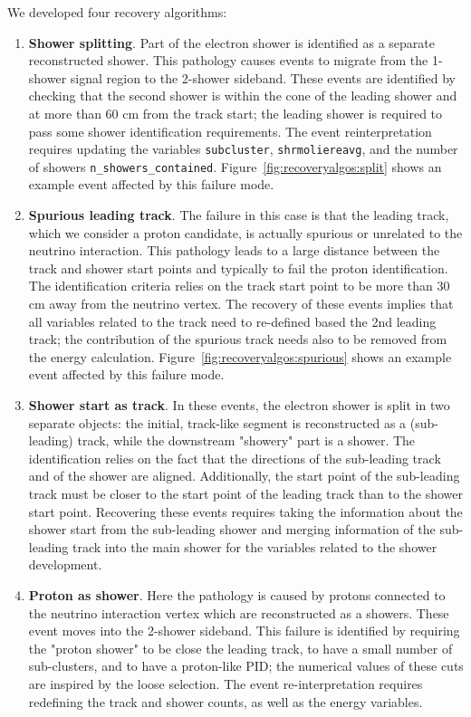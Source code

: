 We developed four recovery algorithms:
\begin{enumerate}
    \item {\bf Shower splitting}. Part of the electron shower is identified as a separate reconstructed shower. This pathology causes \npsel events to migrate from the 1-shower signal region to the 2-shower sideband. These events are identified by checking that the second shower is within the cone of the leading shower and at more than 60 cm from the track start; the leading shower is required to pass some shower identification requirements. The event reinterpretation requires updating the variables \texttt{subcluster}, \texttt{shrmoliereavg}, and the number of showers \texttt{n\_showers\_contained}. Figure~\ref{fig:recoveryalgos:split} shows an example event affected by this failure mode.
    \item {\bf Spurious leading track}. The failure in this case is that the leading track, which we consider a proton candidate, is actually spurious or unrelated to the neutrino interaction. This pathology leads to a large distance between the track and shower start points and typically to fail the proton identification. The identification criteria relies on the track start point to be more than 30 cm away from the neutrino vertex. The recovery of these events implies that all variables related to the track need to re-defined based the 2nd leading track; the contribution of the spurious track needs also to be removed from the energy calculation. Figure~\ref{fig:recoveryalgos:spurious} shows an example event affected by this failure mode.
    \item {\bf Shower start as track}. In these events, the electron shower is split in two separate objects: the initial, track-like segment is reconstructed as a (sub-leading) track, while the downstream "showery" part is a shower. The identification relies on the fact that the directions of the sub-leading track and of the shower are aligned. Additionally, the start point of the sub-leading track must be closer to the start point of the leading track than to the shower start point. Recovering these events requires taking the information about the shower start from the sub-leading shower and merging information of the sub-leading track into the main shower for the variables related to the shower development.
    \item {\bf Proton as shower}. Here the pathology is caused by protons connected to the neutrino interaction vertex which are reconstructed as a showers. These event moves into the 2-shower sideband. This failure is identified by requiring the "proton shower" to be close the leading track, to have a small number of sub-clusters, and to have a proton-like PID; the numerical values of these cuts are inspired by the loose selection. The event re-interpretation requires redefining the track and shower counts, as well as the energy variables.
\end{enumerate}

